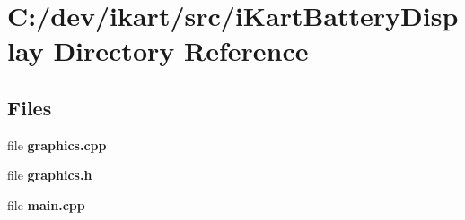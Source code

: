 \section{C\+:/dev/ikart/src/i\+Kart\+Battery\+Display Directory Reference}
\label{dir_16017327ba2decd97fc66ef9d486722f}
\subsection*{Files}
\begin{DoxyCompactItemize}
\item 
file {\bfseries graphics.\+cpp}
\item 
file {\bfseries graphics.\+h}
\item 
file {\bfseries main.\+cpp}
\end{DoxyCompactItemize}
